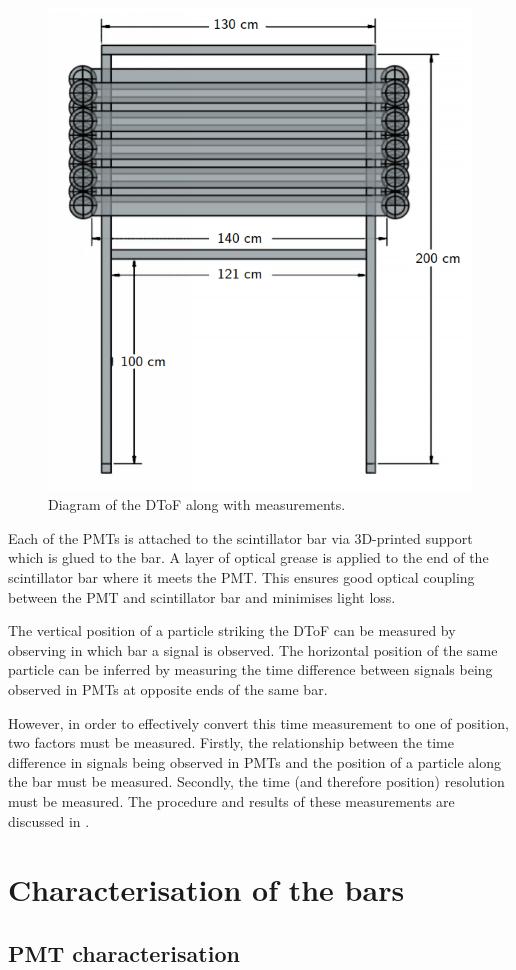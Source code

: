 \begin{figure}[h]
  \centering
  \includegraphics[width=.5\linewidth]{files/figures/hptpc_dtof_characterisation/dstofFront}
  \caption[Diagram of the HPTPC DToF]{Diagram of the DToF along with measurements.}
  \label{fig:dtofDiag}
\end{figure}

Each of the PMTs is attached to the scintillator bar via 3D-printed support which is glued to the bar.
A layer of optical grease is applied to the end of the scintillator bar where it meets the PMT.
This ensures good optical coupling between the PMT and scintillator bar and minimises light loss.

The vertical position of a particle striking the DToF can be measured by observing in which bar a signal is observed.
The horizontal position of the same particle can be inferred by measuring the time difference between signals being observed in PMTs at opposite ends of the same bar.

However, in order to effectively convert this time measurement to one of position, two factors must be measured.
Firstly, the relationship between the time difference in signals being observed in PMTs and the position of a particle along the bar must be measured.
Secondly, the time (and therefore position) resolution must be measured.
The procedure and results of these measurements are discussed in .

\section{Characterisation of the bars}
\label{ch:hptpc_dtof_characterisation:characterisation}

\subsection{PMT characterisation}
\label{ch:hptpc_dtof_characterisation:characterisation:pmt}

